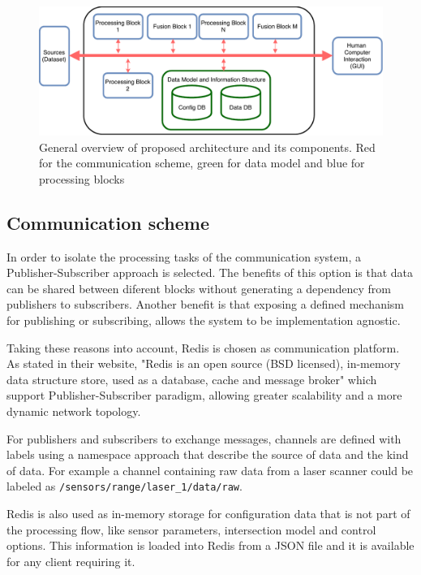 \begin{figure}[ht!]
\centering
\includegraphics[scale=0.7]{fig/3/proposal_blocks.pdf}
\caption{General overview of proposed architecture and its components. Red for the communication scheme, green for data model and blue for processing blocks}
\label{proposal_blocks}
\end{figure} 



\subsection{Communication scheme}

In order to isolate the processing tasks of the communication system, a Publisher-Subscriber approach is selected. The benefits of this option is that data can be shared between diferent blocks without generating a dependency from publishers to subscribers. Another benefit is that exposing a defined mechanism for publishing or subscribing, allows the system to be implementation agnostic.

Taking these reasons into account, Redis is chosen as communication platform. As stated in their website, "Redis is an open source (BSD licensed), in-memory data structure store, used as a database, cache and message broker"\cite{Redis} which support Publisher-Subscriber paradigm, allowing greater scalability and a more dynamic network topology.

For publishers and subscribers to exchange messages, channels are defined with labels using a namespace approach that describe the source of data and the kind of data. For example a channel containing raw data from a laser scanner could be labeled as \texttt{/sensors/range/laser\_1/data/raw}.

Redis is also used as in-memory storage for configuration data that is not part of the processing flow, like sensor parameters, intersection model and control options. This information is loaded into Redis from a JSON file and it is available for any client requiring it.

